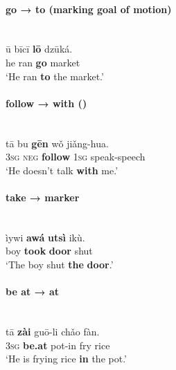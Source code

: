 \documentclass[output=paper]{langsci/langscibook}
\begin{document}
\paragraph*{go → to (marking goal of motion)}

\ea\label{ex:dryer:4}
\\
\gll   ū  bīcī  \textbf{lō}  dzūká.\\
       he  ran  \textbf{go}  market\\
\glt   ‘He ran \textbf{to} the market.’
\z

\paragraph*{follow → with ()}

\ea\label{ex:dryer:5}
\\
\gll   tā  bu  \textbf{gēn}  {wǒ}  jiǎng-hua.\\
       3\textsc{sg}  \textsc{neg}  \textbf{follow}  \textsc{1sg}  speak-speech\\
\glt   ‘He doesn't talk \textbf{with} me.’
\z

\paragraph*{take →   marker}

\ea\label{ex:dryer:6}
\\
\gll     ìywi  \textbf{awá}  \textbf{utsì}  ikù.\\
         boy  \textbf{took} \textbf{door}  shut\\
\glt     ‘The boy shut \textbf{the} \textbf{door}.’
\z

\paragraph*{be at → at}

\ea\label{ex:dryer:7}
\\
\gll     tā  \textbf{zài}  {guō-li}  chǎo  fàn.\\
         3\textsc{sg}  \textbf{be.at}  pot-in  fry  rice\\
\glt     ‘He is frying rice \textbf{in} the pot.’
\z
\end{document}
